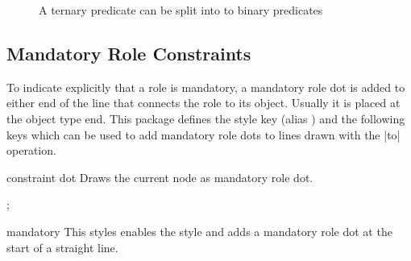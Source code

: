 \documentclass[a4paper,10pt]{article}
\begin{document}
\begin{figure}[h]
\centering
\begin{codeexample}[]
\end{codeexample}
\caption{A ternary predicate can be split into to binary predicates}
\label{fig:splitternary}
\end{figure}


\subsection{Mandatory Role Constraints}
\label{sec:mandatoryconstraints}
To indicate explicitly that a role is mandatory, a mandatory role dot is added to either end of the line that connects the role to its object. Usually it is placed at the object type end. This package defines the style key  (alias ) and the following keys which can be used to add mandatory role dots to lines drawn with the |to| operation.

\begin{stylekey}{constraint dot}
Draws the current node as mandatory role dot.
\begin{codeexample}[]
\tikz \node[cdot] {};
\end{codeexample}
\end{stylekey}

\begin{stylekey}{mandatory}
This styles enables the  style and adds a mandatory role dot at the start of a straight line.
\begin{codeexample}[]
\end{codeexample}
\end{stylekey}
\end{document}
